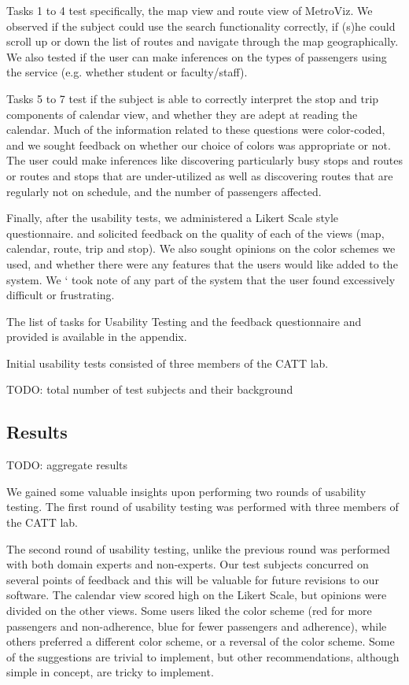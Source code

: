 \documentclass[journal]{vgtc}                %
\begin{document}
Tasks 1 to 4 test specifically, the map view and route view of MetroViz. We observed if the subject could use the search functionality correctly, if (s)he could scroll up or down the list of routes and navigate through the map geographically. We also tested if the user can make inferences on the types of passengers using the service (e.g. whether student or faculty/staff). 

Tasks 5 to 7 test if the subject is able to correctly interpret the stop and trip components of calendar view, and whether they are adept at reading the calendar. Much of the information related to these questions were color-coded, and we sought feedback on whether our choice of colors was appropriate or not. The user could make inferences like discovering particularly busy stops and routes or routes and stops that are under-utilized as well as discovering routes that are regularly not on schedule, and the number of passengers affected.

Finally, after the usability tests, we administered a Likert Scale style questionnaire. and solicited feedback on the quality of each of the views (map, calendar, route, trip and stop). We also sought opinions on the color schemes we used, and whether there were any features that the users would like added to the system. We ` took note of any part of the system that the user found excessively difficult or frustrating.

The list of tasks for Usability Testing and the feedback questionnaire and provided is available in the appendix. 

Initial usability tests consisted of three members of the CATT lab.

TODO: total number of test subjects and their background

\subsection{Results}

TODO: aggregate results

We gained some valuable insights upon performing two rounds of usability testing. The first round of usability testing was performed with three members of the CATT lab. 

The second round of usability testing, unlike the previous round was performed with both domain experts and non-experts. Our test subjects concurred on several points of feedback and this will be valuable for future revisions to our software. The calendar view scored high on the Likert Scale, but opinions were divided on the other views. Some users liked the color scheme (red for more passengers and non-adherence, blue for fewer passengers and adherence), while others preferred a different color scheme, or a reversal of the color scheme. Some of the suggestions are trivial to implement, but other recommendations, although simple in concept, are tricky to implement. 
\end{document}
